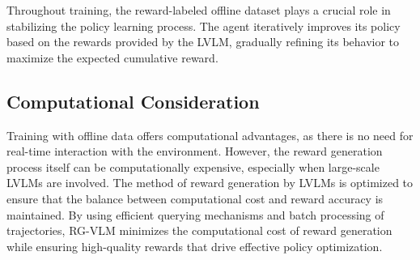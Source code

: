 \documentclass[master,english,final]{kaist-ucs}
\begin{document}
Throughout training, the reward-labeled offline dataset plays a crucial role in stabilizing the policy learning process. The agent iteratively improves its policy based on the rewards provided by the LVLM, gradually refining its behavior to maximize the expected cumulative reward.

\subsection{Computational Consideration}
Training with offline data offers computational advantages, as there is no need for real-time interaction with the environment. However, the reward generation process itself can be computationally expensive, especially when large-scale LVLMs are involved. The method of reward generation by LVLMs is optimized to ensure that the balance between computational cost and reward accuracy is maintained. By using efficient querying mechanisms and batch processing of trajectories, RG-VLM minimizes the computational cost of reward generation while ensuring high-quality rewards that drive effective policy optimization.
\end{document}
